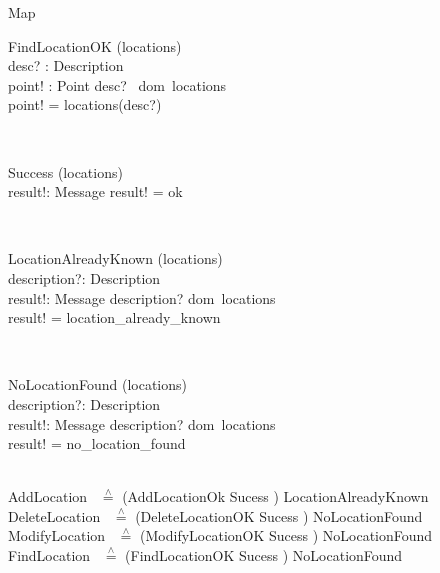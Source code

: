\documentclass[12pt]{article}
\begin{document}
\begin{spacing}{1.5}
\begin{class}{Map}
\begin{op}{FindLocationOK}
\Xi (locations) \\
desc? : Description\\
point! : Point
\ST
desc? \in ~dom~locations \\
point! = locations(desc?)
\end{op}\\
\begin{op}{Success}
\Xi (locations) \\
result!: Message
\ST
result! = ok
\end{op}\\
\zbreak
\begin{op}{LocationAlreadyKnown}
\Xi (locations) \\
description?: Description \\
result!: Message
\ST
description? \in dom~locations \\
result! = location\_already\_known
\end{op}\\
\begin{op}{NoLocationFound}
\Xi (locations) \\
description?: Description \\
result!: Message
\ST
description? \notin dom~locations \\
result! = no\_location\_found
\end{op}\\
AddLocation ~$\stackrel{\wedge}{=}$ (AddLocationOk \land Sucess ) \lor LocationAlreadyKnown
\\
DeleteLocation ~$\stackrel{\wedge}{=}$ (DeleteLocationOK \land Sucess ) \lor NoLocationFound
\\
ModifyLocation ~$\stackrel{\wedge}{=}$ (ModifyLocationOK \land Sucess ) \lor NoLocationFound
\\
FindLocation ~$\stackrel{\wedge}{=}$ (FindLocationOK \land Sucess ) \lor NoLocationFound
\end{class}
\znewpage


\end{spacing}
\end{document}
